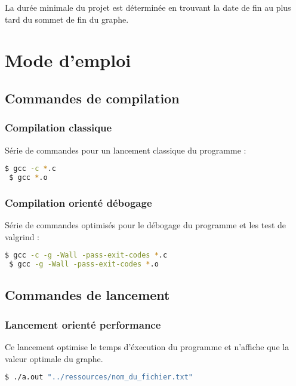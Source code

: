\documentclass{article}
\begin{document}
La durée minimale du projet est déterminée en trouvant la date de fin au plus tard du sommet de fin du graphe.

\section{Mode d’emploi}

\subsection{Commandes de compilation}

\subsubsection{Compilation classique}

Série de commandes pour un lancement classique du programme :

\begin{lstlisting}[language=bash]
 $ gcc -c *.c
 $ gcc *.o
\end{lstlisting}

\subsubsection{Compilation orienté débogage}

Série de commandes optimisés pour le débogage du programme et les test de valgrind :

\begin{lstlisting}[language=bash]
 $ gcc -c -g -Wall -pass-exit-codes *.c
 $ gcc -g -Wall -pass-exit-codes *.o
\end{lstlisting}

\subsection{Commandes de lancement}

\subsubsection{Lancement orienté performance}

Ce lancement optimise le temps d'éxecution du programme et n'affiche que la valeur optimale du graphe.

\begin{lstlisting}[language=bash]
 $ ./a.out "../ressources/nom_du_fichier.txt"  
\end{lstlisting}
\end{document}
